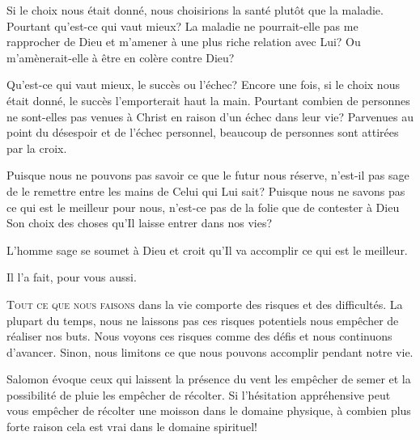 
Si le choix nous était donné, nous choisirions la santé
 plutôt que la maladie. Pourtant qu'est-ce qui vaut mieux?
 La maladie ne pourrait-elle pas me rapprocher de Dieu
 et m'amener à une plus riche relation avec Lui?
 Ou m'amènerait-elle à être en colère contre Dieu? 

Qu'est-ce qui vaut mieux, le succès ou l'échec?
 Encore une fois, si le choix nous était donné,
 le succès l'emporterait haut la main.
 Pourtant combien de personnes ne sont-elles pas venues à Christ
 en raison d'un échec dans leur vie?
 Parvenues au point du désespoir et de l'échec personnel,
 beaucoup de personnes sont attirées par la croix. 

Puisque nous ne pouvons pas savoir ce que le futur nous réserve,
 n'est-il pas sage de le remettre entre les mains de Celui qui Lui sait?
 Puisque nous ne savons pas ce qui est le meilleur pour nous,
 n'est-ce pas de la folie que de contester à Dieu Son choix des choses
 qu'Il laisse entrer dans nos vies? 

L'homme sage se soumet à Dieu et croit qu'Il va accomplir
 ce qui est le meilleur. 

Il l'a fait, pour vous aussi.

\dvrule






\lettrine{T}{out ce que nous faisons} dans la vie
 comporte des risques et des difficultés.
 La plupart du temps, nous ne laissons pas ces risques potentiels
 nous empêcher de réaliser nos buts.
 Nous voyons ces risques comme des défis et nous continuons d'avancer.
 Sinon, nous limitons ce que nous pouvons accomplir pendant notre vie. 

Salomon évoque ceux qui laissent la présence du vent les empêcher
 de semer et la possibilité de pluie les empêcher de récolter.
 Si l'hésitation appréhensive peut vous empêcher de récolter
 une moisson dans le domaine physique, à combien plus forte raison
 cela est vrai dans le domaine spirituel! 

